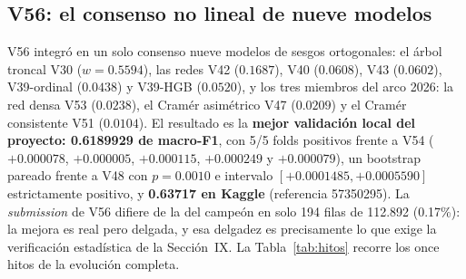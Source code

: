 \documentclass[journal]{IEEEtai}
\begin{document}
\subsection{V56: el consenso no lineal de nueve modelos}

V56 integr\'o en un solo consenso nueve modelos de sesgos ortogonales: el \'arbol troncal V30 ($w = 0.5594$), las redes V42 ($0.1687$), V40 ($0.0608$), V43 ($0.0602$), V39-ordinal ($0.0438$) y V39-HGB ($0.0520$), y los tres miembros del arco 2026: la red densa V53 ($0.0238$), el Cram\'er asim\'etrico V47 ($0.0209$) y el Cram\'er consistente V51 ($0.0104$). El resultado es la \textbf{mejor validaci\'on local del proyecto: 0.6189929 de macro-F1}, con 5/5 folds positivos frente a V54 ($+0.000078$, $+0.000005$, $+0.000115$, $+0.000249$ y $+0.000079$), un bootstrap pareado frente a V48 con $p = 0.0010$ e intervalo $[+0.0001485, +0.0005590]$ estrictamente positivo, y \textbf{0.63717 en Kaggle} (referencia 57350295). La \textit{submission} de V56 difiere de la del campe\'on en solo 194 filas de 112.892 (0.17\%): la mejora es real pero delgada, y esa delgadez es precisamente lo que exige la verificaci\'on estad\'istica de la Secci\'on~IX. La Tabla~\ref{tab:hitos} recorre los once hitos de la evoluci\'on completa.
\end{document}
